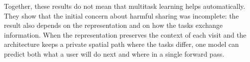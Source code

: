 Together, these results do not mean that multitask learning helps automatically. They show that the initial concern
about harmful sharing was incomplete: the result also depends on the representation and on how the tasks exchange
information. When the representation preserves the context of each visit and the architecture keeps a private spatial
path where the tasks differ, one model can predict both what a user will do next and where in a single forward pass.
